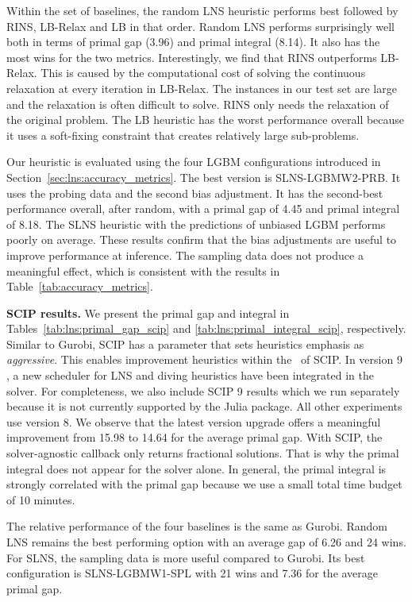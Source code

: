 \documentclass[3p, authoryear, times]{elsarticle}
\begin{document}
Within the set of baselines, the random LNS heuristic performs best followed by RINS, LB-Relax and LB in that order. Random LNS performs surprisingly well both in terms of primal gap (3.96) and primal integral (8.14). It also has the most wins for the two metrics. Interestingly, we find that RINS outperforms LB-Relax. This is caused by the computational cost of solving the continuous relaxation at every iteration in LB-Relax. The instances in our test set are large and the relaxation is often difficult to solve. RINS only needs the relaxation of the original problem. The LB heuristic has the worst performance overall because it uses a soft-fixing constraint that creates relatively large sub-problems. 

Our heuristic is evaluated using the four LGBM configurations introduced in Section~\ref{sec:lns:accuracy_metrics}. The best version is SLNS-LGBMW2-PRB. It uses the probing data and the second bias adjustment. It has the second-best performance overall, after random, with a primal gap of 4.45 and primal integral of 8.18. The SLNS heuristic with the predictions of unbiased LGBM performs poorly on average. These results confirm that the bias adjustments are useful to improve performance at inference. The sampling data does not produce a meaningful effect, which is consistent with the results in Table~\ref{tab:accuracy_metrics}. 

\textbf{SCIP results.} We present the primal gap and integral in Tables~\ref{tab:lns:primal_gap_scip} and \ref{tab:lns:primal_integral_scip}, respectively. Similar to Gurobi, SCIP has a parameter that sets heuristics emphasis as \textit{aggressive}. This enables improvement heuristics within the \bnb\ of SCIP. In version 9 \citep{bolusani_scip_2024}, a new scheduler for LNS and diving heuristics have been integrated in the solver. For completeness, we also include SCIP 9 results which we run separately because it is not currently supported by the Julia package. All other experiments use version 8. We observe that the latest version upgrade offers a meaningful improvement from 15.98 to 14.64 for the average primal gap. With SCIP, the solver-agnostic callback only returns fractional solutions. That is why the primal integral does not appear for the solver alone. In general, the primal integral is strongly correlated with the primal gap because we use a small total time budget of 10 minutes. 

The relative performance of the four baselines is the same as Gurobi. Random LNS remains the best performing option with an average gap of 6.26 and 24 wins. For SLNS, the sampling data is more useful compared to Gurobi. Its best configuration is SLNS-LGBMW1-SPL with 21 wins and 7.36 for the average primal gap. 
\end{document}
